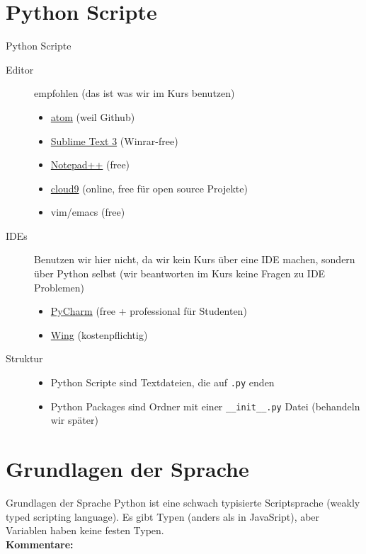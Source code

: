 \section{Python Scripte}
\begin{frame}{Python Scripte}
\begin{description}
   	\item[Editor] empfohlen (das ist was wir im Kurs benutzen)
    \begin{itemize}
        \item \href{https://atom.io}{atom} (weil Github)
        \item \href{http://www.sublimetext.com/3}{Sublime Text 3} (\glqq{}Winrar-free\grqq{})
        \item \href{http://notepad-plus-plus.org}{Notepad++} (free)
        \item \href{https://c9.i}{cloud9} (online, free für open source Projekte)
        \item vim/emacs (free)
    \end{itemize}
    \item[IDEs] Benutzen wir hier nicht, da wir kein Kurs über eine IDE machen, sondern über Python selbst (wir beantworten im Kurs keine Fragen zu IDE Problemen)
   	\begin{itemize}
       	\item \href{https://jetbrains.com/pycharm}{PyCharm} (free + professional für Studenten)
       	\item \href{https://wingware.com/}{Wing} (kostenpflichtig)
   	\end{itemize}
   	\item[Struktur]
   	\begin{itemize}
       	\item Python Scripte sind Textdateien, die auf \texttt{.py} enden
        \item Python Packages sind Ordner mit einer \texttt{\_\_init\_\_.py} Datei (behandeln wir später)
    \end{itemize}
\end{description}
\end{frame}


\section{Grundlagen der Sprache}
\begin{frame}[fragile]{Grundlagen der Sprache}
    Python ist eine schwach typisierte Scriptsprache (weakly typed scripting language). Es gibt Typen (anders als in JavaSript), aber Variablen haben keine festen Typen.\\

    \textbf{Kommentare:}
    
\end{frame}

